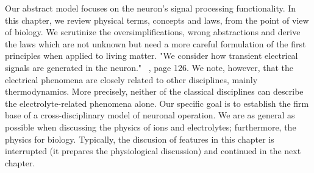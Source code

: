 Our \hypertarget{NeuronPhysical}{abstract model} focuses on the
neuron's signal processing functionality. 
In this chapter, we review physical terms, concepts and laws,
from the point of view of biology.
We scrutinize the oversimplifications, wrong abstractions and derive the laws
which are not unknown but need a more careful formulation of the first principles when applied to living matter.
"We consider
how transient electrical signals are generated in the neuron." ~\cite{PrinciplesNeuralScience:2013}, page 126.
We note, however, that the electrical phenomena are closely related to other disciplines, mainly thermodynamics.
More precisely, neither of the classical disciplines
can describe the electrolyte-related phenomena alone.
Our specific goal is to establish the firm base of a cross-disciplinary model of neuronal operation.
We are as general as possible when discussing the
physics of ions and electrolytes; furthermore, the physics for biology. Typically, the discusion of features in this chapter is interrupted (it prepares the physiological discussion) and continued in the next chapter.


